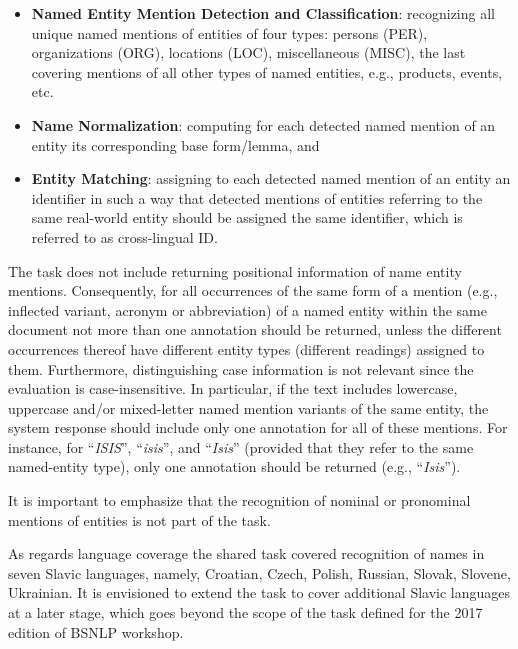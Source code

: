 \documentclass[11pt]{article}
\begin{document}
\begin{itemize}

\item \textbf{Named Entity Mention Detection and Classification}:
  recognizing all unique named mentions of entities of four types:
  persons (PER), organizations (ORG), locations (LOC), miscellaneous
  (MISC), the last covering mentions of all other types of named
  entities, e.g., products, events, etc.

\item \textbf{Name Normalization}: computing for each detected named mention of an entity its corresponding base form/lemma, and

\item \textbf{Entity Matching}: assigning to each detected named mention of an entity an identifier in such a way that detected 
  mentions of entities referring to the same real-world entity should be assigned the same identifier, which is referred to as 
  cross-lingual ID.

\end{itemize}

\noindent The task does not include returning positional information of name entity mentions. Consequently,
for all occurrences of the same form of a mention (e.g., inflected variant, acronym or abbreviation) of a named entity 
within the same document not more than one annotation should be returned, unless the different occurrences thereof have 
different entity types (different readings) assigned to them. Furthermore, distinguishing case information is not relevant
since the evaluation is case-insensitive. In particular, if the text includes lowercase, uppercase and/or mixed-letter 
named mention variants of the same entity, the system response should include only one annotation for all of these mentions. 
For instance, for ``\textit{ISIS}'', ``\textit{isis}'', and ``\textit{Isis}'' (provided that they refer to the same named-entity type), 
only one annotation should be returned (e.g., ``\textit{Isis}'').

It is important to emphasize that the recognition of nominal or pronominal mentions of entities is not part of the task. 

As regards language coverage the shared task covered recognition of names in seven Slavic languages, namely, Croatian, 
Czech, Polish, Russian, Slovak, Slovene, Ukrainian. It is envisioned to extend the task to cover additional Slavic 
languages at a later stage, which goes beyond the scope of the task defined for the 2017 edition of BSNLP workshop.
\end{document}
